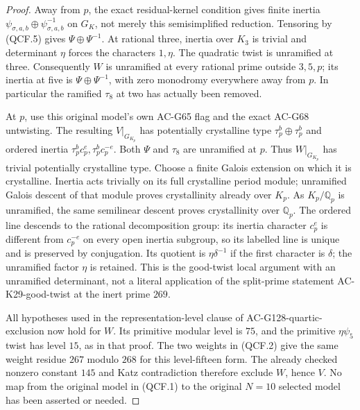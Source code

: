 \begin{proof}
Away from \(p\), the exact residual-kernel condition gives
finite inertia \(\psi_{\sigma,a,b}\oplus
\psi_{\sigma,a,b}^{-1}\) on \(G_K\), not merely this
semisimplified reduction.  Tensoring by (QCF.5) gives
\(\Psi\oplus\Psi^{-1}\).  At rational three, inertia
over \(K_3\) is trivial and determinant \(\eta\) forces
the characters \(1,\eta\).  The quadratic twist is unramified
at three.  Consequently \(W\) is unramified at every rational
prime outside \(3,5,p\); its inertia at five is
\(\Psi\oplus\Psi^{-1}\), with zero monodromy everywhere away
from \(p\).  In particular the ramified \(\tau_8\) at two
has actually been removed.

At \(p\), use this original model's own AC-G65 flag and the
exact AC-G68 untwisting.  The resulting \(V|_{G_{K_p}}\)
has potentially crystalline type \(\tau_p^b\oplus\tau_p^b\)
and ordered inertia \(\tau_p^bc_p^e,\tau_p^bc_p^{-e}\).
Both \(\Psi\) and \(\tau_8\) are unramified at \(p\).
Thus \(W|_{G_{K_p}}\) has trivial potentially crystalline
type.  Choose a finite Galois extension on which it is crystalline.
Inertia acts trivially on its full crystalline period module;
unramified Galois descent of that module proves crystallinity
already over \(K_p\).  As \(K_p/\mathbb Q_p\) is unramified,
the same semilinear descent proves crystallinity over
\(\mathbb Q_p\).  The ordered line descends to the rational
decomposition group: its inertia character \(c_p^e\) is
different from \(c_p^{-e}\) on every open inertia subgroup,
so its labelled line is unique and is preserved by conjugation.
Its quotient is \(\eta\delta^{-1}\) if the first character
is \(\delta\); the unramified factor \(\eta\) is retained.
This is the good-twist local argument with an unramified determinant,
not a literal application of the split-prime statement
AC-K29-good-twist at the inert prime \(269\).

All hypotheses used in the representation-level clause of
AC-G128-quartic-exclusion now hold for \(W\).  Its primitive
modular level is \(75\), and the primitive \(\eta\psi_5\)
twist has level \(15\), as in that proof.  The two weights in
(QCF.2) give the same weight residue \(267\) modulo \(268\)
for this level-fifteen form.  The already checked nonzero constant
\(145\) and Katz contradiction therefore exclude \(W\), hence
\(V\).  No map from the original model in (QCF.1) to the
original \(N=10\) selected model has been asserted or needed.
\end{proof}

